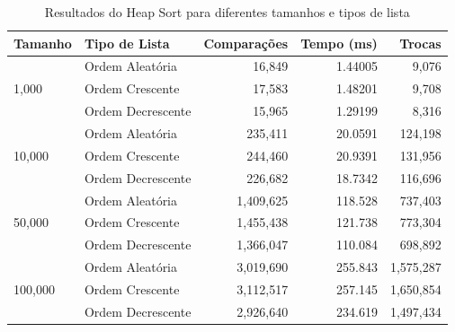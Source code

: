 \documentclass[tcc1,project]{uftex}
\begin{document}
\begin{table}[h]
\centering
\caption{Resultados do Heap Sort para diferentes tamanhos e tipos de lista}
\begin{tabular}{llrrr}
\toprule
\textbf{Tamanho} & \textbf{Tipo de Lista} & \textbf{Comparações} & \textbf{Tempo (ms)} & \textbf{Trocas} \\
\midrule
\multirow{3}{*}{1,000}   & Ordem Aleatória   & 16,849  & 1.44005   & 9,076 \\
                         & Ordem Crescente   & 17,583  & 1.48201   & 9,708 \\
                         & Ordem Decrescente & 15,965  & 1.29199   & 8,316 \\
\midrule
\multirow{3}{*}{10,000}  & Ordem Aleatória   & 235,411  & 20.0591   & 124,198 \\
                         & Ordem Crescente   & 244,460  & 20.9391   & 131,956 \\
                         & Ordem Decrescente & 226,682  & 18.7342   & 116,696 \\
\midrule
\multirow{3}{*}{50,000}  & Ordem Aleatória   & 1,409,625  & 118.528  & 737,403 \\
                         & Ordem Crescente   & 1,455,438  & 121.738  & 773,304 \\
                         & Ordem Decrescente & 1,366,047  & 110.084  & 698,892 \\
\midrule
\multirow{3}{*}{100,000} & Ordem Aleatória   & 3,019,690  & 255.843  & 1,575,287 \\
                         & Ordem Crescente   & 3,112,517  & 257.145  & 1,650,854 \\
                         & Ordem Decrescente & 2,926,640  & 234.619  & 1,497,434 \\
\bottomrule
\end{tabular}
\end{table}
\end{document}
